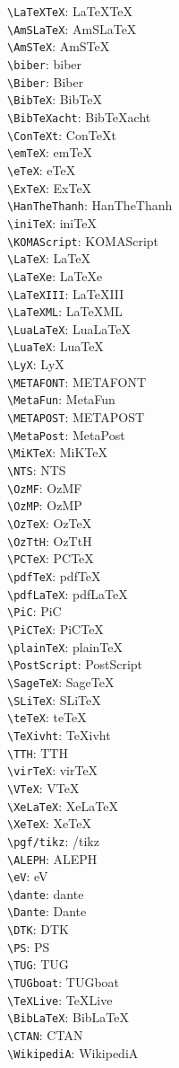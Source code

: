 \documentclass[twocolumn,parskip=half,DIV=13]{scrartcl}
\def\defLogo#1{\texttt{\textbackslash#1}: \csname#1\endcsname\\}
\begin{document}
\raggedright

\defLogo{LaTeXTeX}
\defLogo{AmSLaTeX}
\defLogo{AmSTeX}
\defLogo{biber}
\defLogo{Biber}
\defLogo{BibTeX}
\defLogo{BibTeXacht}
\defLogo{ConTeXt}
\let\context\ConTeXt
\defLogo{emTeX}
\defLogo{eTeX}
\defLogo{ExTeX}
\defLogo{HanTheThanh}
\defLogo{iniTeX}
\defLogo{KOMAScript}
\defLogo{LaTeX}
\defLogo{LaTeXe}
\defLogo{LaTeXIII}
\defLogo{LaTeXML}
\defLogo{LuaLaTeX}
\let\lualatex\LuaLaTeX
\defLogo{LuaTeX}
\let\luatex\LuaTeX
\defLogo{LyX}
\defLogo{METAFONT}
\let\MF\METAFONT
\defLogo{MetaFun}
\defLogo{METAPOST}
\defLogo{MetaPost}
\let\MP\METAPOST
\defLogo{MiKTeX}
\defLogo{NTS}
\defLogo{OzMF}
\defLogo{OzMP}
\defLogo{OzTeX}
\defLogo{OzTtH}
\defLogo{PCTeX}
\defLogo{pdfTeX}
\let\pdftex\pdfTeX
\defLogo{pdfLaTeX}
\let\pdflatex\pdfLaTeX
\defLogo{PiC}
\defLogo{PiCTeX}
\defLogo{plainTeX}
\defLogo{PostScript}
\let\PS\PostScript
\defLogo{SageTeX}
\defLogo{SLiTeX}
\defLogo{teTeX}
\defLogo{TeXivht}
\defLogo{TTH}
\defLogo{virTeX}
\defLogo{VTeX}
\defLogo{XeLaTeX}
\defLogo{XeTeX}
\texttt{\textbackslash pgf/tikz}: \pgf/tikz\\
\defLogo{ALEPH}
\let\TikZ\tikz
%
\defLogo{eV}
\defLogo{dante}
\defLogo{Dante}
\defLogo{DTK}
\defLogo{PS}
\defLogo{TUG}
\defLogo{TUGboat}
\let\DANTE\dantelogo
\defLogo{TeXLive}
%
\defLogo{BibLaTeX}
\let\biblatex\BibLaTeX
\defLogo{CTAN}
\defLogo{WikipediA}
\end{document}
